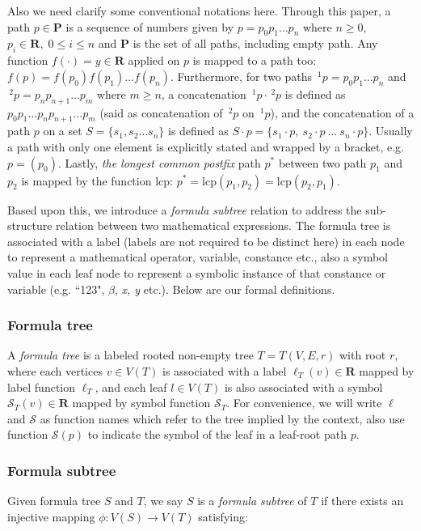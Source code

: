 Also we need clarify some conventional notations here. 
Through this paper, a path $p \in \mathbf{P}$ is a sequence of numbers given by $p = p_0 p_1 \ldots p_n$ where $n\ge0$, $p_i \in \mathbf{R},\; 0 \le i \le n$ and $\mathbf{P}$ is the set of all paths, including empty path. 
Any function $f(\cdot) = y \in \mathbf{R}$ applied on $p$ is mapped to a path too: $f(p)=f(p_0)f(p_1) \ldots f(p_n)$. 
Furthermore, for two paths $\,^1p = p_0p_1 \ldots p_n$ and $\,^2p = p_np_{n+1} \ldots p_m$ where $m \ge n$, a concatenation $\,^1p \cdot \,^2p$ is defined as $p_0p_1 \ldots p_n p_{n+1} \ldots p_m$ (said as concatenation of $\,^2p$ on $\,^1p$), 
and the concatenation of a path $p$ on a set $S = \{ s_1, s_2 \ldots s_n \}$ is defined as $S \cdot p = \{ s_1\cdot p,\  s_2\cdot p \ \ldots \ s_n\cdot p \}$. 
Usually a path with only one element is explicitly stated and wrapped by a bracket, e.g. $p=(p_0)$. 
Lastly, \textit{the longest common postfix} path $p^*$ between two path $p_1$ and $p_2$ is mapped by the function $\mathrm{lcp}$: $p^* = \mathrm{lcp}(p_1, p_2) = \mathrm{lcp}(p_2, p_1)$.

Based upon this,  we introduce a \textit{formula subtree} relation to address the sub-structure relation between two mathematical expressions. 
The formula tree is associated with a label (labels are not required to be distinct here) in each node to represent a mathematical operator, variable, constance etc., also a symbol value in each leaf node to represent a symbolic instance of that constance or variable (e.g. ``123", $\beta$, \textit{x, y} etc.). 
Below are our formal definitions.

\subsubsection{Formula tree}
A \textit{formula tree} is a labeled rooted non-empty tree $T = T(V,E,r)$ with root $r$, where each vertices $v \in V(T)$ is associated with a label $\ell_T(v) \in \mathbf{R}$ mapped by label function $\ell_T$, 
and each leaf $l \in V(T)$ is also associated with a symbol $\mathcal{S}_T(v) \in \mathbf{R}$ mapped by symbol function $\mathcal{S}_T$. For convenience, we will write $\ell$ and $\mathcal{S}$ as function names which refer to the tree implied by the context, also use function $\mathcal{S}(p)$ to indicate the symbol of the leaf in a leaf-root path $p$.

\subsubsection{Formula subtree}
\label{frmlsubtreeDef}
Given formula tree $S$ and $T$, we say $S$ is a \textit{formula subtree} of $T$ if there exists an injective mapping $\phi: V(S) \rightarrow V(T)$ satisfying:

